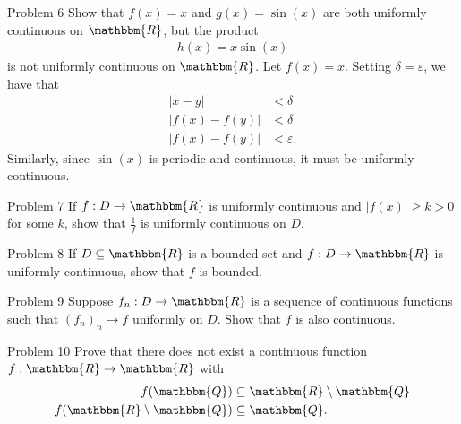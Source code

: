 \documentclass[8pt]{extarticle}
\newcommand{\Q}{\mathbbm{Q}}
\newcommand{\R}{\mathbbm{R}}
\begin{document}
  \begin{problem}{Problem 6}
    Show that $f(x) = x$ and $g(x) = \sin(x)$ are both uniformly continuous on $\R$, but the product
    \begin{align*}
      h(x) = x\sin(x)
    \end{align*}
    is not uniformly continuous on $\R$.
    \tcblower
    Let $f(x) = x$. Setting $\delta = \varepsilon$, we have that
    \begin{align*}
      |x-y| &< \delta\\
      |f(x) - f(y)| &< \delta\\
      |f(x) - f(y)| &< \varepsilon.
    \end{align*}
    Similarly, since $\sin(x)$ is periodic and continuous, it must be uniformly continuous.
  \end{problem}
  \begin{problem}{Problem 7}
    If $f: D\rightarrow \R$ is uniformly continuous and $|f(x)| \geq k > 0$ for some $k$, show that $\frac{1}{f}$ is uniformly continuous on $D$.
  \end{problem}
  \begin{problem}{Problem 8}
    If $D\subseteq \R$ is a bounded set and $f: D\rightarrow \R$ is uniformly continuous, show that $f$ is bounded.
  \end{problem}
  \begin{problem}{Problem 9}
    Suppose $f_n: D\rightarrow \R$ is a sequence of continuous functions such that $(f_n)_n \rightarrow f$ uniformly on $D$. Show that $f$ is also continuous.
  \end{problem}
  \begin{problem}{Problem 10}
    Prove that there does not exist a continuous function $f: \R\rightarrow \R$ with
    \begin{align*}
      f(\Q) &\subseteq \R\setminus\Q\\
      f(\R\setminus\Q) &\subseteq \Q.
    \end{align*}
  \end{problem}
\end{document}
